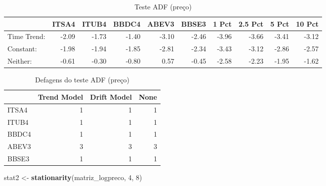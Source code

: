 \documentclass[]{article}
\newenvironment{Shaded}{\begin{snugshade}}{\end{snugshade}}
\newcommand{\KeywordTok}[1]{\textcolor[rgb]{0.13,0.29,0.53}{\textbf{{#1}}}}
\newcommand{\DataTypeTok}[1]{\textcolor[rgb]{0.13,0.29,0.53}{{#1}}}
\newcommand{\DecValTok}[1]{\textcolor[rgb]{0.00,0.00,0.81}{{#1}}}
\newcommand{\StringTok}[1]{\textcolor[rgb]{0.31,0.60,0.02}{{#1}}}
\newcommand{\OtherTok}[1]{\textcolor[rgb]{0.56,0.35,0.01}{{#1}}}
\newcommand{\NormalTok}[1]{{#1}}
\begin{document}
\begin{longtable}[t]{lrrrrrrrrr}
\caption{\label{tab:unnamed-chunk-10}Teste ADF (preço)}\\
\toprule
  & ITSA4 & ITUB4 & BBDC4 & ABEV3 & BBSE3 & 1 Pct & 2.5 Pct & 5 Pct & 10 Pct\\
\midrule
Time Trend: & -2.09 & -1.73 & -1.40 & -3.10 & -2.46 & -3.96 & -3.66 & -3.41 & -3.12\\
Constant: & -1.98 & -1.94 & -1.85 & -2.81 & -2.34 & -3.43 & -3.12 & -2.86 & -2.57\\
Neither: & -0.61 & -0.30 & -0.80 & 0.57 & -0.45 & -2.58 & -2.23 & -1.95 & -1.62\\
\bottomrule
\end{longtable}

\begin{Shaded}
\end{Shaded}

\begin{longtable}[t]{lrrr}
\caption{\label{tab:unnamed-chunk-10}Defagens do teste ADF (preço)}\\
\toprule
  & Trend Model & Drift Model & None\\
\midrule
ITSA4 & 1 & 1 & 1\\
ITUB4 & 1 & 1 & 1\\
BBDC4 & 1 & 1 & 1\\
ABEV3 & 3 & 3 & 3\\
BBSE3 & 1 & 1 & 1\\
\bottomrule
\end{longtable}

\begin{Shaded}
\begin{Highlighting}[]
\NormalTok{stat2 <-}\StringTok{ }\KeywordTok{stationarity}\NormalTok{(matriz_logpreco, }\DecValTok{4}\NormalTok{, }\DecValTok{8}\NormalTok{)}
\end{Highlighting}
\end{Shaded}

\begin{Shaded}
\end{Shaded}
\end{document}

